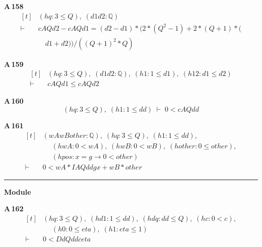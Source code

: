 \noindent\textbf{A\,158}\quad{}
{\footnotesize\[ \begin{aligned}[t]
&(\mathit{hq} : 3 \leq \mathit{Q}),\; (\mathit{d1} \mathit{d2} : \mathbb{Q} )\\
\vdash\;&\mathit{cA} \mathit{Q} \mathit{d2} - \mathit{cA} \mathit{Q} \mathit{d1} = (\mathit{d2} - \mathit{d1})*(2*(\mathit{Q}^{2} - 1) + 2*(\mathit{Q} + 1)*(\\
&\quad \mathit{d1} + \mathit{d2})) / ((\mathit{Q} + 1)^{2}*\mathit{Q})
\end{aligned} \]}

\noindent\textbf{A\,159}\quad{}
{\footnotesize\[ \begin{aligned}[t]
&(\mathit{hq} : 3 \leq \mathit{Q}),\; (\mathit{d1} \mathit{d2} : \mathbb{Q} ),\; (\mathit{h1} : 1 \leq \mathit{d1}),\; (\mathit{h12} : \mathit{d1} \leq \mathit{d2})\\
\vdash\;&\mathit{cA} \mathit{Q} \mathit{d1} \leq \mathit{cA} \mathit{Q} \mathit{d2}
\end{aligned} \]}

\noindent\textbf{A\,160}\quad{}
{\footnotesize\[ (\mathit{hq} : 3 \leq \mathit{Q}),\; (\mathit{h1} : 1 \leq \mathit{dd}) \;\vdash\; 0 < \mathit{cA} \mathit{Q} \mathit{dd} \]}

\noindent\textbf{A\,161}\quad{}
{\footnotesize\[ \begin{aligned}[t]
&(\mathit{wA} \mathit{wB} \mathit{other} : \mathbb{Q} ),\; (\mathit{hq} : 3 \leq \mathit{Q}),\; (\mathit{h1} : 1 \leq \mathit{dd}),\\
&\quad \; (\mathit{hwA} : 0 < \mathit{wA}),\; (\mathit{hwB} : 0 < \mathit{wB}),\; (\mathit{hother} : 0 \leq \mathit{other}),\\
&\quad \; (\mathit{hpos} : \mathit{x} = \mathit{g} \to 0 < \mathit{other})\\
\vdash\;&0 < \mathit{wA} * \mathit{IA} \mathit{Q} \mathit{dd} \mathit{g} \mathit{x} + \mathit{wB} * \mathit{other}
\end{aligned} \]}

\vspace{4pt}\noindent\rule{\columnwidth}{0.4pt}\par\vspace{2pt}
\noindent\textbf{Module }\par\vspace{3pt}

\noindent\textbf{A\,162}\quad{}
{\footnotesize\[ \begin{aligned}[t]
&(\mathit{hq} : 3 \leq \mathit{Q}),\; (\mathit{hd1} : 1 \leq \mathit{dd}),\; (\mathit{hdq} : \mathit{dd} \leq \mathit{Q}),\; (\mathit{hc} : 0 < \mathit{c}),\\
&\quad \; (\mathit{h0} : 0 \leq \mathit{eta}),\; (\mathit{h1} : \mathit{eta} \leq 1)\\
\vdash\;&0 < \mathit{Dd} \mathit{Q} \mathit{dd} \mathit{c} \mathit{eta}
\end{aligned} \]}

